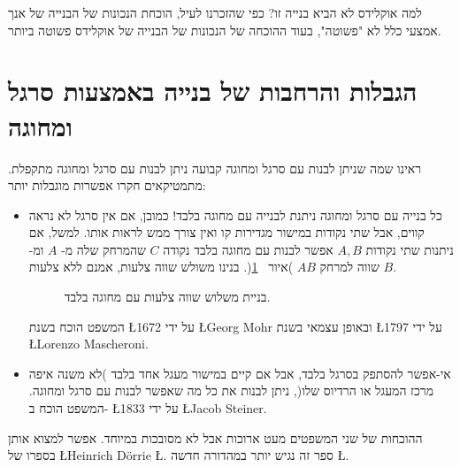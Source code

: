 \documentclass[12pt,a4paper]{article}
\begin{document}
למה אוקלידס לא הביא בנייה זו? כפי שהזכרנו לעיל, הוכחת הנכונות של הבנייה של אנך אמצעי כלל לא "פשוטה", בעוד ההוכחה של הנכונות של הבנייה של אוקלידס פשוטה ביותר.



\section{
הגבלות והרחבות של בנייה באמצעות סרגל ומחוגה
}

ראינו שמה שניתן לבנות עם סרגל ומחוגה קבועה ניתן לבנות עם סרגל ומחוגה מתקפלת. מתמטיקאים חקרו אפשרות מוגבלות יותר:

\begin{itemize}
\item
כל בנייה עם סרגל ומחוגה ניתנת לבנייה עם מחוגה בלבד! כמובן, אם אין סרגל לא נראה קווים, אבל שתי נקודות במישור מגדירות קו ואין צורך ממש לראות אותו. למשל, אם ניתנות שתי נקודות
$A,B$
אפשר לבנות עם מחוגה בלבד נקודה
$C$
שהמרחק שלה מ-%
$A$
ומ-%
$B$
שווה למרחק
$AB$
)איור~%
\ref{fig.mm}(.
בנינו משולש שווה צלעות, אמנם ללא צלעות.

\begin{figure}[H]
\begin{center}
\caption{%
בניית משלוש שווה צלעות עם מחוגה בלבד.%
}\label{fig.mm}
\end{center}
\end{figure}

המשפט הוכח בשנת
\L{1672}
על ידי
\L{Georg Mohr}
ובאופן עצמאי בשנת
\L{1797}
על ידי
\L{Lorenzo Mascheroni}.

\item
אי-אפשר להסתפק בסרגל בלבד, אבל אם קיים במישור מעגל אחד בלבד )לא משנה איפה מרכז המעגל או הרדיוס שלו(, ניתן לבנות את כל מה שאפשר לבנות עם סרגל ומחוגה. המשפט הוכח ב-%
\L{1833}
על ידי 
\L{Jacob Steiner}.
\end{itemize}
ההוכחות של שני המשפטים מעט ארוכות אבל לא מסובכות במיוחד. אפשר למצוא אותן בספרו של
\L{Heinrich D\"{o}rrie}
\L{\cite{dorrie1}}.
ספר זה נגיש יותר במהדורה חדשה 
\L{\cite{dorrie2}}.
\end{document}
